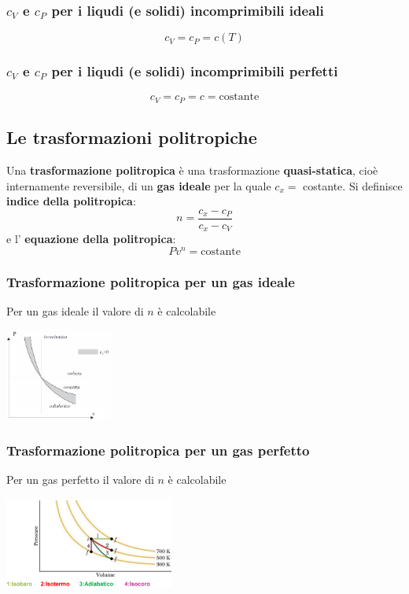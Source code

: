 \subsubsection{$c_V$ e $c_P$ per i liqudi (e solidi) incomprimibili ideali}
\[
    c_V = c_P = c(T)
\]
\subsubsection{$c_V$ e $c_P$ per i liqudi (e solidi) incomprimibili perfetti}
\[
    c_V = c_P = c = \text{costante}
\]
\subsection{Le trasformazioni politropiche}
Una \textbf{trasformazione politropica} è una trasformazione \textbf{quasi-statica}, cioè internamente reversibile, di un \textbf{gas ideale} per la quale $c_x = $ costante.\newline
\newline
Si definisce \textbf{indice della politropica}:
\[
    n = \frac{c_x-c_P}{c_x-c_V}
\]
e l' \textbf{equazione della politropica}:
\[
    Pv^n = \text{costante}
\]
\subsubsection{Trasformazione politropica per un gas ideale}
Per un gas ideale il valore di $n$ è calcolabile
\begin{center}
    \includegraphics[height=3cm]{../L03/img6.PNG}
\end{center}
\subsubsection{Trasformazione politropica per un gas perfetto}
Per un gas perfetto il valore di $n$ è calcolabile
\begin{center}
    \includegraphics[height=3cm]{../L03/img7.PNG}
\end{center}
